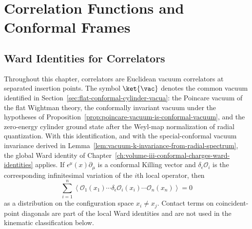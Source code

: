 \chapter{Correlation Functions and Conformal Frames}
\label{ch:volume-iii-correlation-functions-conformal-frames}
\ConventionsEuclideanCFT


\section{Ward Identities for Correlators}

Throughout this chapter, correlators are Euclidean vacuum correlators at
separated insertion points.  The symbol \(\ket{\vac}\) denotes the common
vacuum identified in
Section~\ref{sec:flat-conformal-cylinder-vacua}: the Poincare vacuum of the
flat Wightman theory, the conformally invariant vacuum under the hypotheses of
Proposition~\ref{prop:poincare-vacuum-is-conformal-vacuum}, and the
zero-energy cylinder ground state after the Weyl-map normalization of radial
quantization.  With this identification, and with the special-conformal
vacuum invariance derived in
Lemma~\ref{lem:vacuum-k-invariance-from-radial-spectrum}, the global Ward
identity of Chapter~\ref{ch:volume-iii-conformal-charges-ward-identities}
applies.  If
\(\epsilon^\mu(x)\partial_\mu\) is a conformal Killing vector and
\(\delta_\epsilon\mathcal O_i\) is the corresponding infinitesimal variation of
the \(i\)th local operator, then
\begin{equation}
  \sum_{i=1}^n
  \left\langle
    \mathcal O_1(x_1)\cdots
    \delta_\epsilon\mathcal O_i(x_i)\cdots
    \mathcal O_n(x_n)
  \right\rangle
  =
  0
  \label{eq:correlator-global-ward-identity}
\end{equation}
as a distribution on the configuration space \(x_i\ne x_j\).  Contact terms on
coincident-point diagonals are part of the local Ward identities and are not
used in the kinematic classification below.

